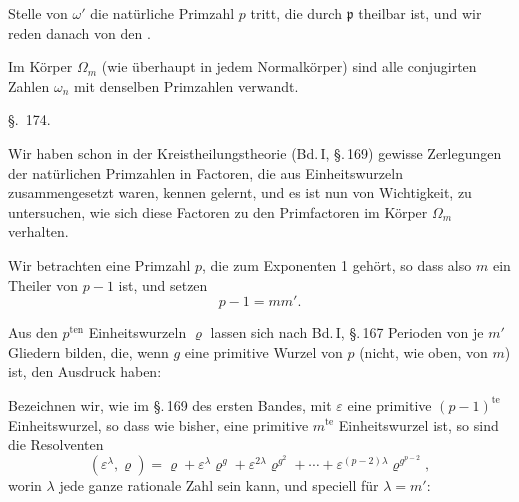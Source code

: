 Stelle von $\omega'$ die natürliche Primzahl $p$ tritt, die durch $\mathfrak p$ theilbar
 ist, und wir reden danach von den .


Im Körper $\Omega_m$ (wie überhaupt in jedem Normalkörper) sind
alle conjugirten Zahlen $\omega_n$ mit denselben Primzahlen verwandt.

\begin{center}
\S.\ 174.

\end{center}

Wir haben schon in der Kreistheilungstheorie (Bd.\,I, \S.\,169)
gewisse Zerlegungen der natürlichen Primzahlen in Factoren, die
aus Einheitswurzeln zusammengesetzt waren, kennen gelernt,
und es ist nun von Wichtigkeit, zu untersuchen, wie sich diese
Factoren zu den Primfactoren im Körper $\Omega_m$ verhalten.

Wir betrachten eine Primzahl $p$, die zum Exponenten 1
gehört, so dass also $m$ ein Theiler von $p-1$ ist, und setzen
\[
p - 1 = m m'.
\]

Aus den $p^{\mathrm{ten}}$ Einheitswurzeln $\varrho$ lassen sich nach Bd.\,I, \S.\,167
Perioden von je $m'$ Gliedern bilden, die, wenn $g$ eine primitive
Wurzel von $p$ (nicht, wie oben, von $m$) ist, den Ausdruck haben:

Bezeichnen wir, wie im \S.\,169 des ersten Bandes, mit $\varepsilon$ eine
primitive $(p-1)^{\mathrm{te}}$ Einheitswurzel, so dass
wie bisher, eine primitive $m^{\mathrm{te}}$ Einheitswurzel ist, so sind die
Resolventen
\begin{equation*}\tag*{3)}
(\varepsilon^\lambda, \varrho) = \varrho + \varepsilon^\lambda \varrho^g + \varepsilon^{2\lambda}\varrho^{g^2} + \cdots + \varepsilon^{(p-2)\lambda}\varrho^{g^{p-2}},
\end{equation*}
worin $\lambda$ jede ganze rationale Zahl sein kann, und speciell für
$\lambda = m'$:
